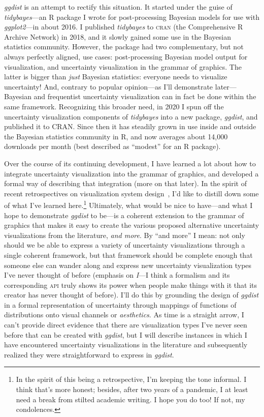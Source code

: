 \documentclass[journal]{vgtc}                     %
\begin{document}
\textit{ggdist} is an attempt to rectify this situation. It started under the guise of \textit{tidybayes}---an R package I wrote for post-processing Bayesian models for use with \textit{ggplot2}---in about 2016. I published \textit{tidybayes} to \textsc{cran} (the Comprehensive R Archive Network) in 2018, and it slowly gained some use in the Bayesian statistics community. However, the package had two complementary, but not always perfectly aligned, use cases: post-processing Bayesian model output for visualization, and uncertainty visualization in the grammar of graphics. The latter is bigger than \textit{just} Bayesian statistics: everyone needs to visualize uncertainty! And, contrary to popular opinion---as I'll demonstrate later---Bayesian and frequentist uncertainty visualization can in fact be done within the same framework. Recognizing this broader need, in 2020 I spun off the uncertainty visualization components of \textit{tidybayes} into a new package, \textit{ggdist}, and published it to CRAN. Since then it has steadily grown in use inside and outside the Bayesian statistics community in R, and now averages about 14,000 downloads per month (best described as ``modest'' for an R package).

Over the course of its continuing development, I have learned a lot about how to integrate uncertainty visualization into the grammar of graphics, and developed a formal way of describing that integration (more on that later). In the spirit of recent retrospectives on visualization system design~\cite{satyanarayan2019critical}, I'd like to distill down some of what I've learned here.\footnote{In the spirit of this being a retrospective, I'm keeping the tone informal. I think that's more honest; besides, after two years of a pandemic, I at least need a break from stilted academic writing. I hope you do too! If not, my condolences.} Ultimately, what would be nice to have---and what I hope to demonstrate \textit{ggdist} to be---is a coherent extension to the grammar of graphics that makes it easy to create the various proposed alternative uncertainty visualizations from the literature, \textit{and more}. By  ``and more'' I mean: not only should we be able to express a variety of uncertainty visualizations through a single coherent framework, but that framework should be complete enough that someone else can wander along and express new uncertainty visualization types I've never thought of before (emphasis on \textit{I}---I think a formalism and its corresponding \textsc{api} truly shows its power when people make things with it that its creator has never thought of before). I'll do this by grounding the design of \textit{ggdist} in a formal representation of uncertainty through mappings of functions of distributions onto visual channels or \textit{aesthetics}. As time is a straight arrow, I can't provide direct evidence that there are visualization types I've never seen before that can be created with \textit{ggdist}, but I will describe instances in which I have encountered uncertainty visualizations in the literature and subsequently realized they were straightforward to express in \textit{ggdist}.
\end{document}
